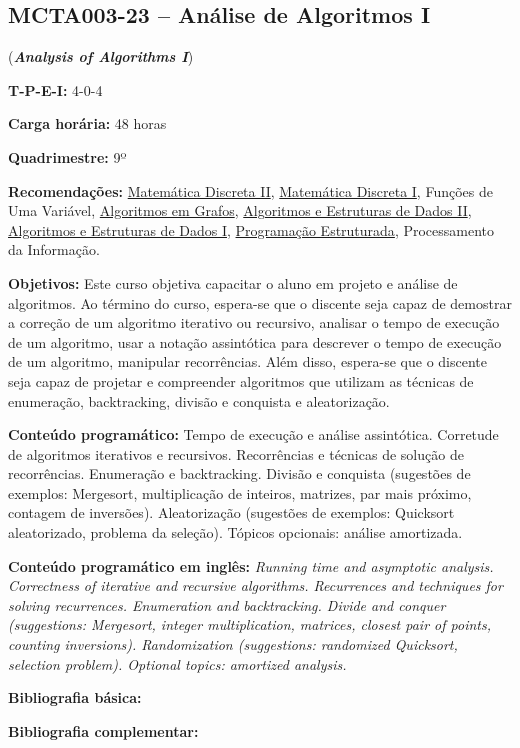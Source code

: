 \documentclass[class=article, crop=false]{standalone}
\begin{document}
\subsection*{MCTA003-23 -- Análise de Algoritmos I}
\label{disc:aaI}

(\textbf{\textit{Analysis of Algorithms I}})

\begin{center}
    \begin{minipage}{0.85\textwidth}
        \textbf{T-P-E-I:} 4-0-4
        
        \textbf{Carga horária:} 48 horas
        
        \textbf{Quadrimestre:} 9º
        
        \textbf{Recomendações:} 
        \hyperref[disc:mdII]{Matemática Discreta II},
        \hyperref[disc:mdI]{Matemática Discreta I},
        Funções de Uma Variável,
        \hyperref[disc:ag]{Algoritmos em Grafos},
        \hyperref[disc:aedII]{Algoritmos e Estruturas de Dados II},
        \hyperref[disc:aedI]{Algoritmos e Estruturas de Dados I},
        \hyperref[disc:pe]{Programação Estruturada},
        Processamento da Informação.
    \end{minipage}
\end{center}

\textbf{Objetivos:}
Este curso objetiva capacitar o aluno em projeto e análise de algoritmos. 
Ao término do curso, espera-se que o discente seja capaz de demostrar a
correção de um algoritmo iterativo ou recursivo, analisar o tempo de execução
de um algoritmo, usar a notação assintótica para descrever o tempo de execução
de um algoritmo, manipular recorrências.
Além disso, espera-se que o discente seja capaz de projetar e compreender
algoritmos que utilizam as técnicas de enumeração, backtracking, divisão e
conquista e aleatorização.


\textbf{Conteúdo programático:}
Tempo de execução e análise assintótica.
Corretude de algoritmos iterativos e recursivos.
Recorrências e técnicas de solução de recorrências.
Enumeração e backtracking.
Divisão e conquista (sugestões de exemplos: Mergesort, multiplicação de
inteiros, matrizes, par mais próximo, contagem de inversões).
Aleatorização (sugestões de exemplos: Quicksort aleatorizado, problema da seleção). 
Tópicos opcionais: análise amortizada.

\textbf{Conteúdo programático em inglês:}
\textit{Running time and asymptotic analysis.
Correctness of iterative and recursive algorithms.
Recurrences and techniques for solving recurrences.
Enumeration and backtracking.
Divide and conquer (suggestions: Mergesort, integer multiplication, matrices, closest pair of points, counting inversions).
Randomization (suggestions: randomized Quicksort, selection problem).
Optional topics: amortized analysis.}

\newrefsection
\textbf{Bibliografia básica:}
\nocite{2012-cormen-etal, 2008-dasgupta-etal, 1998-sedgewick}
\printbibliography

\newrefsection
\textbf{Bibliografia complementar:}
\nocite{2011-sedgewick-wayne, 2006-kleinberg-tardos, 1989-manber}
\printbibliography
\end{document}
